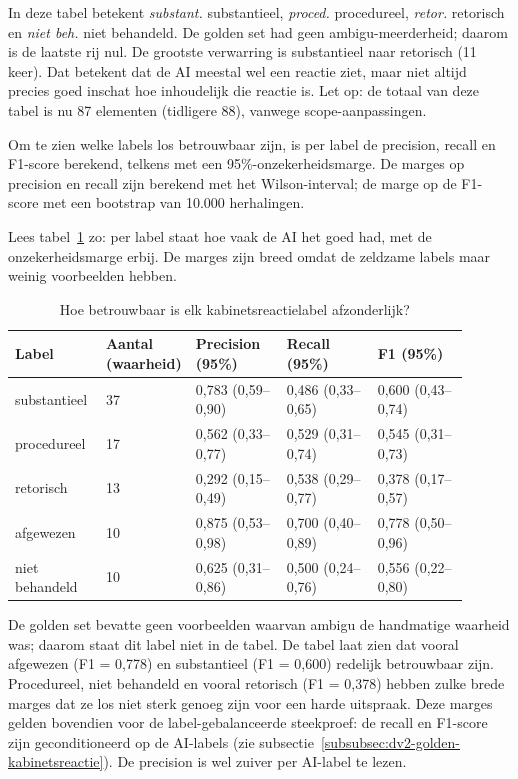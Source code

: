In deze tabel betekent \emph{substant.} substantieel, \emph{proced.} procedureel, \emph{retor.} retorisch en \emph{niet beh.} niet behandeld. De golden set had geen ambigu-meerderheid; daarom is de laatste rij nul. De grootste verwarring is substantieel naar retorisch (11 keer). Dat betekent dat de AI meestal wel een reactie ziet, maar niet altijd precies goed inschat hoe inhoudelijk die reactie is. Let op: de totaal van deze tabel is nu 87 elementen (tidligere 88), vanwege scope-aanpassingen.

Om te zien welke labels los betrouwbaar zijn, is per label de precision, recall en F1-score berekend, telkens met een 95\%-onzekerheidsmarge. De marges op precision en recall zijn berekend met het Wilson-interval; de marge op de F1-score met een bootstrap van 10.000 herhalingen.

Lees tabel~\ref{tab:dv2-perlabel-kabinetsreactie} zo: per label staat hoe vaak de AI het goed had, met de onzekerheidsmarge erbij. De marges zijn breed omdat de zeldzame labels maar weinig voorbeelden hebben.

\begin{table}[htbp]
\centering
\scriptsize
\caption{Hoe betrouwbaar is elk kabinetsreactielabel afzonderlijk?}
\label{tab:dv2-perlabel-kabinetsreactie}
\begin{tabular}{p{0.20\linewidth}p{0.10\linewidth}p{0.20\linewidth}p{0.20\linewidth}p{0.20\linewidth}}
\hline
Label & Aantal (waarheid) & Precision (95\%) & Recall (95\%) & F1 (95\%) \\
\hline
substantieel & 37 & 0,783 (0,59--0,90) & 0,486 (0,33--0,65) & 0,600 (0,43--0,74) \\
procedureel & 17 & 0,562 (0,33--0,77) & 0,529 (0,31--0,74) & 0,545 (0,31--0,73) \\
retorisch & 13 & 0,292 (0,15--0,49) & 0,538 (0,29--0,77) & 0,378 (0,17--0,57) \\
afgewezen & 10 & 0,875 (0,53--0,98) & 0,700 (0,40--0,89) & 0,778 (0,50--0,96) \\
niet behandeld & 10 & 0,625 (0,31--0,86) & 0,500 (0,24--0,76) & 0,556 (0,22--0,80) \\
\hline
\end{tabular}
\end{table}

De golden set bevatte geen voorbeelden waarvan ambigu de handmatige waarheid was; daarom staat dit label niet in de tabel. De tabel laat zien dat vooral afgewezen (F1 = 0,778) en substantieel (F1 = 0,600) redelijk betrouwbaar zijn. Procedureel, niet behandeld en vooral retorisch (F1 = 0,378) hebben zulke brede marges dat ze los niet sterk genoeg zijn voor een harde uitspraak. Deze marges gelden bovendien voor de label-gebalanceerde steekproef: de recall en F1-score zijn geconditioneerd op de AI-labels (zie subsectie~\ref{subsubsec:dv2-golden-kabinetsreactie}). De precision is wel zuiver per AI-label te lezen.

